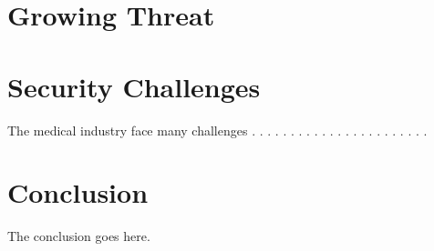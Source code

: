 \documentclass{IEEEtran}
\begin{document}
\section{Growing Threat}

\section{Security Challenges}

The medical industry face many challenges \cite{Sametinger}.
\cite{coventry2018cybersecurity}.
\cite{williams2015cybersecurity}.
\cite{moses2015lack}.
\cite{ferrara2019cybersecurity}.
\cite{murphy2015cybersecurity}.
\cite{stites2016secure}.
\cite{Wang:2018:MDR:3243734.3278513}.
\cite{Ray:2014:AMM:2600176.2600192}.
\cite{gerard2013cybersecurity}.
\cite{mahler2018know}.
\cite{ma2019medical}.
\cite{busdicker2017role}.
\cite{martin2017cybersecurity}.
\cite{Marwan:2017:DSF:3090354.3090361}.
\cite{FooKune:2012:TSI:2342536.2342540}.
\cite{Almohri:2017:TMM:3204094.3204113}.
\cite{tk2013inside}.
\cite{fu2014controlling}.
\cite{tanev2015value}.
\cite{Sametinger:2015:SCM:2749359.2667218}.
\cite{tanev2015value}.
\cite{CyberSecurity}.


\section{Conclusion}
The conclusion goes here.





\end{document}
